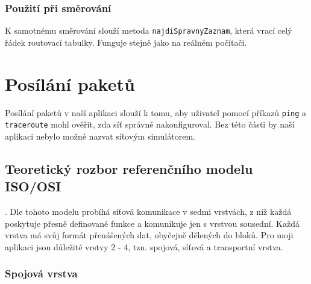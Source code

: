 \subsubsection{Použití při směrování}

K samotnému směrování slouží metoda \verb|najdiSpravnyZaznam|, která vrací celý řádek routovací tabulky. Funguje stejně jako na reálném počítači.




\section{Posílání paketů}


Posílání paketů v naší aplikaci slouží k tomu, aby uživatel pomocí příkazů \verb|ping| a \verb|traceroute| mohl ověřit, zda síť správně nakonfiguroval. Bez této části by naší aplikaci nebylo možné nazvat síťovým simulátorem.


\subsection{Teoretický rozbor referenčního modelu ISO/OSI}

\cite{wiki:referencni_model}. Dle tohoto modelu probíhá síťová komunikace v sedmi vrstvách, z níž každá poskytuje přesně definované funkce a komunikuje jen s vrstvou sousední. Každá vrstva má svůj formát přenášených dat, obyčejně dělených do bloků. Pro moji aplikaci jsou důležité vrstvy 2 - 4, tzn. spojová, síťová a transportní vrstva.

\subsubsection{Spojová vrstva}

